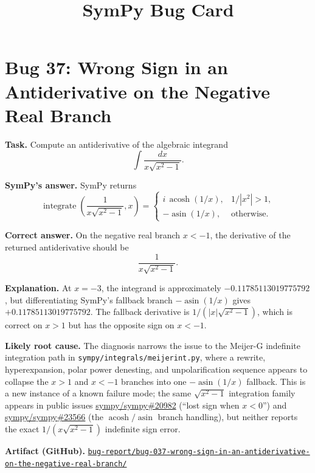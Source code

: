 \documentclass[11pt]{article}
\title{SymPy Bug Card}
\date{}
\newcommand{\artifactrepo}{https://github.com/TODO-org/TODO-repo}
\newcommand{\bugbundle}[1]{\href{\artifactrepo/tree/main/bug-report/#1}{\nolinkurl{bug-report/#1/}}}
\begin{document}
\author{}
\maketitle

\section*{Bug 37: Wrong Sign in an Antiderivative on the Negative Real Branch}

\begin{counterexamplebox}
\textbf{Task.} Compute an antiderivative of the algebraic integrand
\[
    \int \dfrac{dx}{x\sqrt{x^2-1}} .
\]

\medskip
\textbf{SymPy's answer.} SymPy returns
\[
    \operatorname{integrate}\!\left(\dfrac{1}{x\sqrt{x^2-1}},x\right)
    =
    \begin{cases}
    i\,\operatorname{acosh}(1/x), & 1/|x^2|>1,\\
    -\operatorname{asin}(1/x), & \text{otherwise.}
    \end{cases}
\]

\medskip
\textbf{Correct answer.} On the negative real branch \(x<-1\), the derivative
of the returned antiderivative should be
\[
    \dfrac{1}{x\sqrt{x^2-1}} .
\]

\medskip
\textbf{Explanation.} At \(x=-3\), the integrand is approximately
\(-0.11785113019775792\), but differentiating SymPy's fallback branch
\(-\operatorname{asin}(1/x)\) gives \(+0.11785113019775792\).  The fallback derivative is
\(1/(|x|\sqrt{x^2-1})\), which is correct on \(x>1\) but has the opposite sign
on \(x<-1\).

\medskip
\textbf{Likely root cause.} The diagnosis narrows the issue to the Meijer-G
indefinite integration path in \nolinkurl{sympy/integrals/meijerint.py}, where a
rewrite, hyperexpansion, polar power denesting, and unpolarification sequence
appears to collapse the \(x>1\) and \(x<-1\) branches into one
\(-\operatorname{asin}(1/x)\) fallback.  This is a new instance of a known failure mode;
the same \(\sqrt{x^2-1}\) integration family appears in public issues
\href{https://github.com/sympy/sympy/issues/20982}{sympy/sympy\#20982}
(``lost sign when \(x<0\)'') and
\href{https://github.com/sympy/sympy/issues/23566}{sympy/sympy\#23566}
(the \(\operatorname{acosh}/\operatorname{asin}\) branch handling), but neither
reports the exact \(1/(x\sqrt{x^2-1})\) indefinite sign error.

\medskip
\textbf{Artifact (GitHub).} \bugbundle{bug-037-wrong-sign-in-an-antiderivative-on-the-negative-real-branch}
\end{counterexamplebox}
\end{document}
